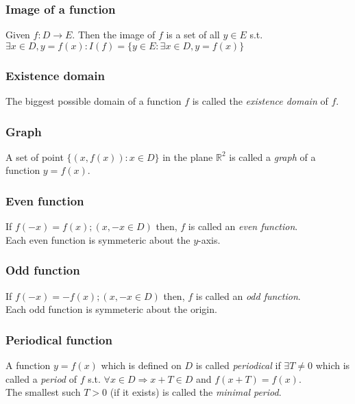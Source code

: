 \documentclass[]{article}
\begin{document}
\subsubsection{Image of a function}

Given $f : D \rightarrow E$. Then the image of $f$ is a set of all $y \in E$ s.t. $\exists x \in D, y = f(x) : I(f) = \{ y \in E : \exists x \in D, y = f(x)\}$ \\

\subsubsection{Existence domain}

The biggest possible domain of a function $f$ is called the \emph{existence domain} of $f$. \\

\subsubsection{Graph}

A set of point $\{(x, f(x)) : x \in D\}$ in the plane $\mathbb{R}^2$ is called a \emph{graph} of a function $y = f(x)$. \\

\subsubsection{Even function}

If $f(-x) = f(x) ; (x, -x \in D)$ then, $f$ is called an \emph{even function}. \\
Each even function is symmeteric about the $y$-axis. \\

\subsubsection{Odd function}

If $f(-x) = -f(x) ; (x, -x \in D)$ then, $f$ is called an \emph{odd function}. \\
Each odd function is symmeteric about the origin. \\

\subsubsection{Periodical function}

A function $y = f(x)$ which is defined on $D$ is called \emph{periodical} if $\exists T \neq 0$ which is called a \emph{period} of $f$ s.t. $\forall x \in D \Rightarrow x + T \in D$ and $f(x+T) = f(x)$. \\
The smallest such $T > 0$ (if it exists) is called the \emph{minimal period}. \\
\end{document}
